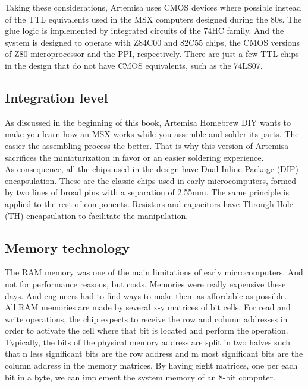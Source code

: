 Taking these considerations, Artemisa uses CMOS devices where possible instead of the TTL equivalents used in the MSX computers designed during the 80s. The glue logic is implemented by integrated circuits of the 74HC family. And the system is designed to operate with Z84C00 and 82C55 chips, the CMOS versions of Z80 microprocessor and the PPI, respectively. There are just a few TTL chips in the design that do not have CMOS equivalents, such as the 74LS07.

\subsection{Integration level}

As discussed in the beginning of this book, Artemisa Homebrew DIY wants to make you learn how an MSX works while you assemble and solder its parts. The easier the assembling process the better. That is why this version of Artemisa sacrifices the miniaturization in favor or an easier soldering experience. \\

As consequence, all the chips used in the design have Dual Inline Package (DIP) encapsulation.  These are the classic chips used in early microcomputers, formed by two lines of broad pins with a separation of 2.55mm. The same principle is applied to the rest of components. Resistors and capacitors have Through Hole (TH) encapsulation to facilitate the manipulation. \\

\subsection{Memory technology}

The RAM memory was one of the main limitations of early microcomputers. And not for performance reasons, but costs. Memories were really expensive these days. And engineers had to find ways to make them as affordable as possible. \\

All RAM memories are made by several x-y matrices of bit cells. For read and write operations, the chip expects to receive the row and column addresses in order to activate the cell where that bit is located and perform the operation. Typically, the bits of the physical memory address are split in two halves such that n less significant bits are the row address and m most significant bits are the column address in the memory matrices. By having eight matrices, one per each bit in a byte, we can implement the system memory of an 8-bit computer. \\

